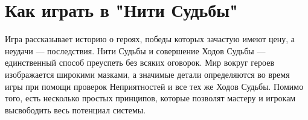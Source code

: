 \section*{Как играть в "Нити Судьбы"}
Игра рассказывает историю о героях, победы которых зачастую имеют цену, а неудачи — последствия. Нити Судьбы и совершение Ходов Судьбы — единственный способ преуспеть без всяких оговорок. Мир вокруг героев изображается широкими мазками, а значимые детали определяются во время игры при помощи проверок Неприятностей и все тех же Ходов Судьбы. Помимо того, есть несколько простых принципов, которые позволят мастеру и игрокам высвободить весь потенциал системы.